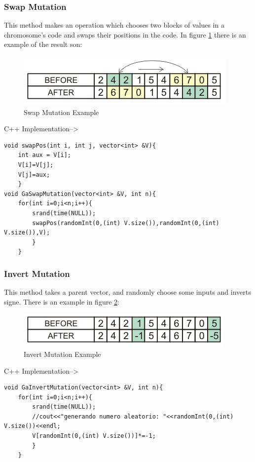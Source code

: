 \documentclass[letterpaper]{article}
\begin{document}
\subsubsection{Swap Mutation}

This method makes an operation which chooses two blocks of values in a chromosome's code and swaps their positions in the code. In figure \ref{F:swap} there is an example of the result son:

\begin{figure}[h]
\centering
\includegraphics[width=0.7\linewidth]{images/swap.png}
\caption{Swap Mutation Example}
\label{F:swap}
\end{figure}


\bigskip
\bigskip
C++ Implementation-->
\bigskip
\bigskip

\lstset{language=C++}
\begin{lstlisting}
void swapPos(int i, int j, vector<int> &V){
	int aux = V[i];
	V[i]=V[j];
	V[j]=aux;
	}
void GaSwapMutation(vector<int> &V, int n){
	for(int i=0;i<n;i++){
		srand(time(NULL));
		swapPos(randomInt(0,(int) V.size()),randomInt(0,(int) V.size()),V);
		}
	}
\end{lstlisting}


\subsubsection{Invert Mutation}

This method takes a parent vector, and randomly choose some inputs and inverts signe. There is an example in figure \ref{F:invert}:

\begin{figure}[h]
\centering
\includegraphics[width=0.7\linewidth]{images/invert.png}
\caption{Invert Mutation Example}
\label{F:invert}
\end{figure}

\bigskip
\bigskip
C++ Implementation-->
\bigskip
\bigskip


\lstset{language=C++}
\begin{lstlisting}
void GaInvertMutation(vector<int> &V, int n){
	for(int i=0;i<n;i++){
		srand(time(NULL));
		//cout<<"generando numero aleatorio: "<<randomInt(0,(int) V.size())<<endl;
		V[randomInt(0,(int) V.size())]*=-1;
		}
	}
\end{lstlisting}
\end{document}
